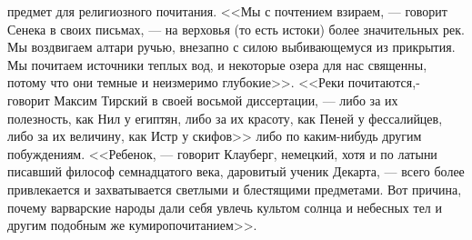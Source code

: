 \documentclass[12pt]{article}
\begin{document}
предмет для религиозного почитания. <<Мы с почтением взираем, --- говорит Сенека в своих письмах, --- на верховья (то есть истоки) более значительных рек. Мы воздвигаем алтари ручью, внезапно с силою выбивающемуся из прикрытия. Мы почитаем источники теплых вод, и некоторые озера для нас священны, потому что они темные и неизмеримо глубокие>>. <<Реки почитаются,- говорит Максим Тирский в своей восьмой диссертации, --- либо за их полезность, как Нил у египтян, либо за их красоту, как Пеней у фессалийцев, либо за их величину, как Истр у скифов>>  либо по каким-нибудь другим побуждениям. <<Ребенок, --- говорит Клауберг, немецкий, хотя и по латыни писавший философ семнадцатого века, даровитый ученик Декарта, --- всего более привлекается и захватывается светлыми и блестящими предметами. Вот причина, почему варварские народы дали себя увлечь культом солнца и небесных тел и другим подобным же кумиропочитанием>>. 
\end{document}
